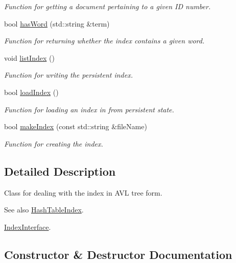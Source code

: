\begin{DoxyCompactItemize}
\begin{DoxyCompactList}\small\item\em Function for getting a document pertaining to a given I\+D number. \end{DoxyCompactList}\item 
bool \hyperlink{class_a_v_l_tree_index_acb31068c39161358ec6545df5feaabc0}{has\+Word} (std\+::string \&term)
\begin{DoxyCompactList}\small\item\em Function for returning whether the index contains a given word. \end{DoxyCompactList}\item 
void \hyperlink{class_a_v_l_tree_index_a603741ace3489018f33f5ba4282e3f0d}{list\+Index} ()
\begin{DoxyCompactList}\small\item\em Function for writing the persistent index. \end{DoxyCompactList}\item 
bool \hyperlink{class_a_v_l_tree_index_af161b8697db7e3f599abc78a36f8d145}{load\+Index} ()
\begin{DoxyCompactList}\small\item\em Function for loading an index in from persistent state. \end{DoxyCompactList}\item 
bool \hyperlink{class_a_v_l_tree_index_a37200f167e48a7b24cb012b9ff5cf44c}{make\+Index} (const std\+::string \&file\+Name)
\begin{DoxyCompactList}\small\item\em Function for creating the index. \end{DoxyCompactList}\end{DoxyCompactItemize}


\subsection{Detailed Description}
Class for dealing with the index in A\+V\+L tree form. 

\begin{DoxySeeAlso}{See also}
\hyperlink{class_hash_table_index}{Hash\+Table\+Index}. 

\hyperlink{class_index_interface}{Index\+Interface}. 
\end{DoxySeeAlso}


\subsection{Constructor \& Destructor Documentation}
\hypertarget{class_a_v_l_tree_index_aba8dc551ea4963a8082991f52bb19c25}{}

